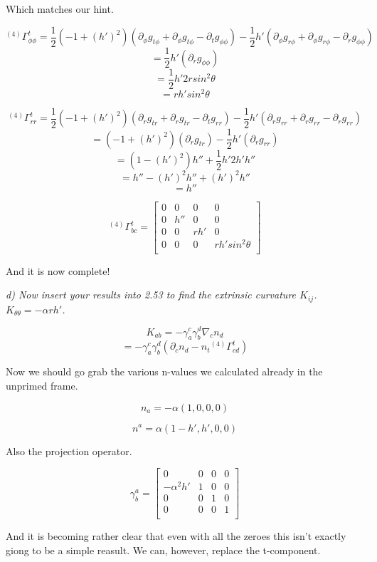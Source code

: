 \documentclass[landscape,letterpaper,10pt,english]{article}
\begin{document}
Which matches our hint.

    \[ {}^{(4)}\Gamma^t_{\phi\phi} = \frac12 (-1+(h')^2) (\partial_\phi g_{t\phi} + \partial_\phi g_{t\phi} - \partial_t g_{\phi\phi}) - \frac12 h'(\partial_\phi g_{r\phi} + \partial_\phi g_{r\phi} - \partial_r g_{\phi\phi}) \]
\[  = \frac12 h'(\partial_r g_{\phi\phi}) \]
\[  = \frac12 h'2rsin^2\theta \] \[  =  rh'sin^2\theta \]

    \[ {}^{(4)}\Gamma^t_{rr} = \frac12 (-1+(h')^2) (\partial_r g_{tr} + \partial_r g_{tr} - \partial_t g_{rr}) - \frac12 h'(\partial_r g_{rr} + \partial_r g_{rr} - \partial_r g_{rr}) \]
\[  =  (-1+(h')^2) (\partial_r g_{tr}) - \frac12 h'(\partial_r g_{rr}) \]
\[  =  (1-(h')^2) h'' + \frac12 h' 2 h' h'' \]
\[  =  h''-(h')^2h'' + (h')^2 h'' \] \[  = h'' \]

    \[ {}^{(4)}\Gamma^t_{bc} = \begin{bmatrix}
0 & 0 & 0 & 0 \\
0 & h'' & 0 & 0 \\
0 & 0 & rh' & 0 \\
0 & 0 & 0 & rh'sin^2\theta \\
\end{bmatrix}\]

And it is now complete!

    \emph{d) Now insert your results into 2.53 to find the extrinsic
curvature \(K_{ij}\). \(K_{\theta\theta} = -\alpha r h'\).}

    \[ K_{ab} = -\gamma^c_a \gamma^d_b \nabla_c n_d\]
\[ = -\gamma^c_a \gamma^d_b (\partial_c n_d - n_t {}^{(4)}\Gamma^t_{cd})\]

    Now we should go grab the various n-values we calculated already in the
unprimed frame.

\[ n_a = -\alpha(1,0,0,0) \]

\[ n^a = \alpha(1-h', h',0,0) \]

Also the projection operator.

\[ \gamma^a_b = \begin{bmatrix}
0 & 0 & 0 & 0 \\
-\alpha^2h' & 1 & 0 & 0 \\
0 & 0 & 1 & 0 \\
0 & 0 & 0 & 1 \\
\end{bmatrix}\]

    And it is becoming rather clear that even with all the zeroes this isn't
exactly giong to be a simple reasult. We can, however, replace the
t-component.
\end{document}
